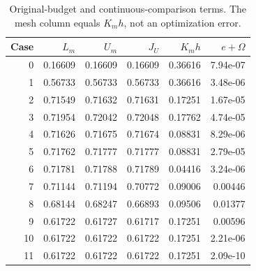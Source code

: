\begin{table}[p]\centering
\caption{Original-budget and continuous-comparison terms. The mesh column equals $K_mh$, not an optimization error.}\label{tab:r44-values}
\small\begin{tabular}{rrrrrr}\toprule
Case & $L_m$ & $U_m$ & $J_U$ & $K_mh$ & $e+\Omega$\\\midrule
0 & 0.16609 & 0.16609 & 0.16609 & 0.36616 & 7.94e-07\\
1 & 0.56733 & 0.56733 & 0.56733 & 0.36616 & 3.48e-06\\
2 & 0.71549 & 0.71632 & 0.71631 & 0.17251 & 1.67e-05\\
3 & 0.71954 & 0.72042 & 0.72048 & 0.17762 & 4.74e-05\\
4 & 0.71626 & 0.71675 & 0.71674 & 0.08831 & 8.29e-06\\
5 & 0.71762 & 0.71777 & 0.71777 & 0.08831 & 2.79e-05\\
6 & 0.71781 & 0.71788 & 0.71789 & 0.04416 & 3.24e-06\\
7 & 0.71144 & 0.71194 & 0.70772 & 0.09006 & 0.00446\\
8 & 0.68144 & 0.68247 & 0.66893 & 0.09506 & 0.01377\\
9 & 0.61722 & 0.61727 & 0.61717 & 0.17251 & 0.00596\\
10 & 0.61722 & 0.61722 & 0.61722 & 0.17251 & 2.21e-06\\
11 & 0.61722 & 0.61722 & 0.61722 & 0.17251 & 2.09e-10\\
\bottomrule\end{tabular}\end{table}
